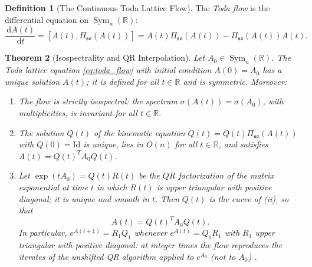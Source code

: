 \documentclass[11pt,a4paper,reqno]{amsart}
\newtheorem{theorem}{Theorem}[section]
\theoremstyle{definition}
\newtheorem{definition}[theorem]{Definition}
\numberwithin{equation}{section}
\providecommand{\R}{\mathbb{R}}
\newcommand{\Id}{\mathrm{Id}}
\newcommand{\dif}{\,\mathrm{d}}
\providecommand{\R}{\mathbb{R}}
\begin{document}
\begin{definition}[The Continuous Toda Lattice Flow]
The \emph{Toda flow} is the differential equation on $\operatorname{Sym}_n(\R)$:
\begin{equation}
    \label{eq:toda_flow}
    \frac{\dif A(t)}{\dif t} = [A(t), \Pi_{\mathfrak{so}}(A(t))] = A(t) \Pi_{\mathfrak{so}}(A(t)) - \Pi_{\mathfrak{so}}(A(t)) A(t).
\end{equation}
\end{definition}

\begin{theorem}[Isospectrality and QR Interpolation]
\label{thm:toda_qr}
Let $A_0 \in \operatorname{Sym}_n(\R)$. The Toda lattice equation \eqref{eq:toda_flow} with initial condition $A(0) = A_0$ has a unique solution $A(t)$; it is defined for all $t \in \R$ and is symmetric. Moreover:
\begin{enumerate}[label=(\roman*)]
    \item The flow is \emph{strictly isospectral}: the spectrum $\sigma(A(t)) = \sigma(A_0)$, with multiplicities, is invariant for all $t \in \R$.
    \item The solution $Q(t)$ of the kinematic equation $\dot{Q}(t) = Q(t) \Pi_{\mathfrak{so}}(A(t))$ with $Q(0) = \Id$ is unique, lies in $O(n)$ for all $t \in \R$, and satisfies $A(t) = Q(t)^T A_0 Q(t)$.
    \item Let $\exp(t A_0) = Q(t) R(t)$ be the $QR$ factorization of the matrix exponential at time $t$ in which $R(t)$ is upper triangular with positive diagonal; it is unique and smooth in $t$. Then $Q(t)$ is the curve of (ii), so that
    \begin{equation}
        A(t) = Q(t)^T A_0 Q(t).
    \end{equation}
    In particular, $e^{A(t+1)} = R_1 Q_1$ whenever $e^{A(t)} = Q_1 R_1$ with $R_1$ upper triangular with positive diagonal: at integer times the flow reproduces the iterates of the unshifted QR algorithm applied to $e^{A_0}$ (not to $A_0$) \cite{symes1982qr, deift1983ode}.
\end{enumerate}
\end{theorem}
\end{document}
